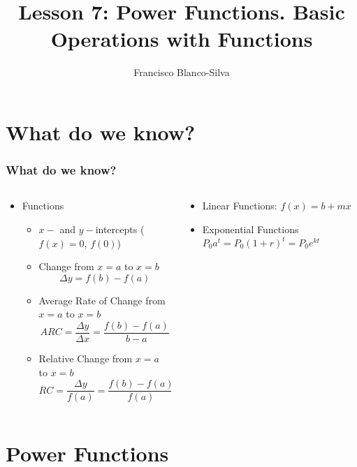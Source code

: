 \documentclass[9pt,xcolor=x11names,compress]{beamer}
\title{Lesson 7: Power Functions.  Basic Operations with Functions}
\author[Francisco Blanco-Silva]{Francisco Blanco-Silva}
\institute[USC]{University of South Carolina}
\date{
\pgfdeclarelindenmayersystem{Sierpinski triangle}{
\rule{F -> G-F-G}
\rule{G -> F+G+F}}
	\begin{tikzpicture} 
    \shadedraw [top color=DeepSkyBlue4, bottom color=black, draw=DeepSkyBlue4]
[l-system={Sierpinski triangle, step=1pt, angle=60, axiom=F, order=8}]
lindenmayer system -- cycle;
	\end{tikzpicture}
}
\begin{document}
\frame{\titlepage}

\section{What do we know?}
\begin{frame}
\frametitle{What do we know?}
\begin{columns}[T]
\begin{column}{0.6\linewidth}
\begin{itemize}
\item Functions
\begin{itemize}
\item $x-$ and $y-$intercepts ($f(x)=0$, $f(0)$)
\item Change from $x=a$ to $x=b$ 
\begin{equation*}
	\Delta y = f(b)-f(a)
\end{equation*}
\item Average Rate of Change from $x=a$ to $x=b$
\begin{equation*}
ARC=\frac{\Delta y}{\Delta x}=\frac{f(b)-f(a)}{b-a} 
\end{equation*}
\item Relative Change from $x=a$ to $x=b$
\begin{equation*}
RC=\frac{\Delta y}{f(a)}=\frac{f(b)-f(a)}{f(a)}
\end{equation*}
\end{itemize}
\end{itemize}
\end{column}
\begin{column}{0.4\linewidth}
\begin{itemize}
	\item Linear Functions: $f(x)=b+mx$
	\item Exponential Functions $P_0 a^t = P_0 (1+r)^t = P_0 e^{kt}$
\end{itemize}
\end{column}
\end{columns}
\end{frame}

\section{Power Functions}
\end{document}
